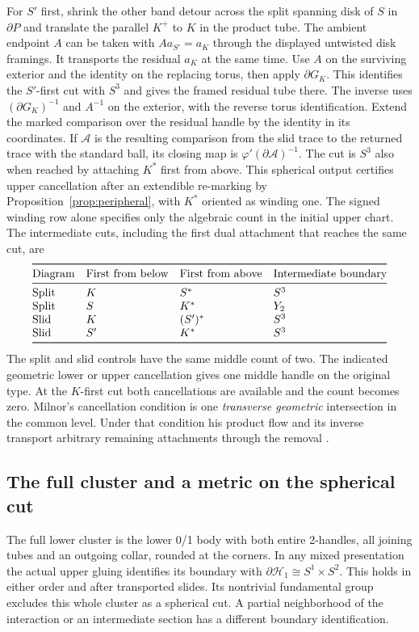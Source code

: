 \documentclass[11pt,letterpaper]{article}
\numberwithin{equation}{section}
\theoremstyle{remark}
\newcommand{\HB}[1]{\mathcal H_{#1}}
\begin{document}
For \(S'\) first, shrink the other band detour across the
split spanning disk of \(S\) in \(\partial P\) and translate
the parallel \(K^+\) to \(K\) in the product tube. The
ambient endpoint \(A\) can be taken with \(A a_{S'}=a_K\)
through the displayed untwisted disk framings. It transports
the residual \(a_K\) at the same time. Use \(A\) on the
surviving exterior and the identity on the replacing torus,
then apply \(\partial G_K\). This identifies the \(S'\)-first
cut with \(S^3\) and gives the framed residual tube there.
The inverse uses \((\partial G_K)^{-1}\) and \(A^{-1}\) on
the exterior, with the reverse torus identification. Extend the marked comparison
over the residual handle by the identity in its coordinates.
If \(\mathcal A\) is the resulting comparison from the slid trace
to the returned trace with the standard ball, its closing map is
\(\varphi'(\partial\mathcal A)^{-1}\).
The cut is \(S^3\) also when reached by attaching \(K^*\) first
from above. This spherical output certifies upper cancellation
after an extendible re-marking by Proposition~\ref{prop:peripheral},
with \(K^*\) oriented as winding one. The signed winding row
alone specifies only the algebraic count in the initial upper chart.
The intermediate cuts, including the first dual attachment
that reaches the same cut, are
\[
 \begin{array}{@{}llll@{}}
 \toprule
 \text{Diagram}&\text{First from below}&\text{First from above}
     &\text{Intermediate boundary}\\
 \midrule
 \text{Split}&K&S^*&S^3\\
 \text{Split}&S&K^*&Y_2\\
 \text{Slid}&K&(S')^*&S^3\\
 \text{Slid}&S'&K^*&S^3\\
 \bottomrule
 \end{array}
\]
The split and slid controls have the same middle count of two.
The indicated geometric lower or upper cancellation gives one
middle handle on the original type. At the \(K\)-first cut
both cancellations are available and the count becomes zero.
Milnor's cancellation condition is one
\emph{transverse geometric} intersection in the common level.
Under that condition his product flow and its inverse transport
arbitrary remaining attachments through the removal
\cite[Theorem 5.4]{Milnor1965HCobordism}.

\subsection{The full cluster and a metric on the spherical cut}
The full lower cluster is the lower 0/1 body with both entire
2-handles, all joining tubes and an outgoing collar, rounded at
the corners. In any mixed presentation
the actual upper gluing identifies its boundary with
\(\partial\HB{1}\cong S^1\times S^2\). This holds in either
order and after transported slides. Its nontrivial fundamental
group excludes this whole cluster as a spherical cut. A partial
neighborhood of the interaction or an intermediate section
has a different boundary identification.
\end{document}
